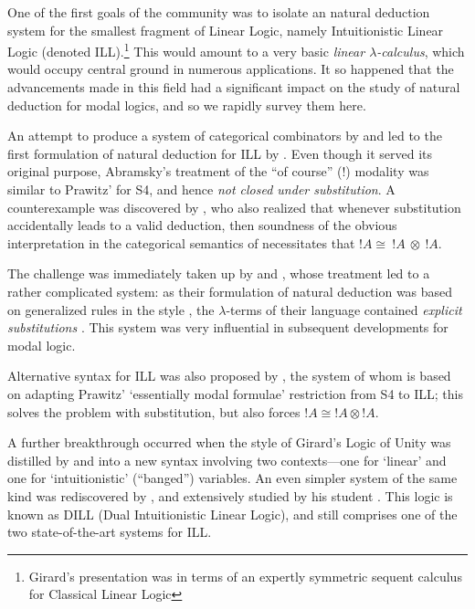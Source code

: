 \documentclass[a4paper]{amsart}
\begin{document}
One of the first goals of the community was to isolate an
natural deduction system for the smallest fragment of Linear
Logic, namely Intuitionistic Linear Logic (denoted
\textsf{ILL}).\footnote{Girard's presentation was in terms of an
expertly symmetric sequent calculus for Classical Linear Logic}
This would amount to a very basic \emph{linear
$\lambda$-calculus}, which would occupy central ground in numerous
applications. It so happened that the advancements made in this
field had a significant impact on the study of natural deduction
for modal logics, and so we rapidly survey them here.

An attempt to produce a system of categorical combinators by
\cite{Girard1986} and \cite{Lafont1988} led to the first
formulation of natural deduction for \textsf{ILL} by
\cite{Abramsky1990, Abramsky1993}. Even though it served
its original purpose, Abramsky's treatment of the ``of course''
($!$) modality was similar to Prawitz' for \textsf{S4}, and hence
\emph{not closed under substitution}. A counterexample was
discovered by \cite{Wadler1991, Wadler1992, Wadler1994}, who also
realized that whenever substitution accidentally leads to a valid
deduction, then soundness of the obvious interpretation in the
categorical semantics of \cite{Seely1989} necessitates that $!A
\cong\ !A\ \otimes\ !A$.

The challenge was immediately taken up by \cite{Bierman1992} and
\cite{Benton1993b}, whose treatment led to a rather complicated
system: as their formulation of natural deduction was based on
generalized rules in the style \cite{Schroeder-Heister1984}, the
$\lambda$-terms of their language contained \emph{explicit
substitutions} \citep{Abadi1991}. This system was very influential
in subsequent developments for modal logic.

Alternative syntax for \textsf{ILL} was also proposed by
\cite{Troelstra1995}, the system of whom is based on adapting
Prawitz' `essentially modal formulae' restriction from \textsf{S4} to
\textsf{ILL}; this solves the problem with substitution, but also forces
${!}A \cong {!}A \otimes {!}A$.

A further breakthrough occurred when the style of Girard's Logic
of Unity \citep{Girard1993} was distilled by \cite{Andreoli1992}
and \cite{Wadler1993, Wadler1994} into a new syntax involving two
contexts---one for `linear' and one for `intuitionistic'
(``banged'') variables. An even simpler system of the same kind
was rediscovered by \cite{Plotkin1993}, and extensively studied by
his student \cite{Barber1996, Barber1997}. This logic is known as
\textsf{DILL} (Dual Intuitionistic Linear Logic), and still
comprises one of the two state-of-the-art systems for
\textsf{ILL}.
\end{document}
